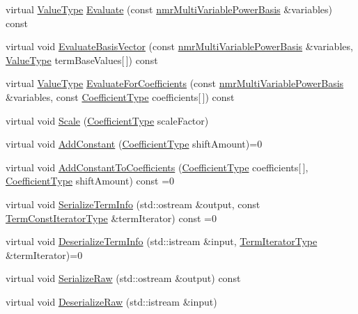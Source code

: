 \begin{DoxyCompactItemize}
\item 
virtual \hyperlink{classnmr_polynomial_base_a72f0bc16b225e4708bcf15a77ba206e3}{Value\+Type} \hyperlink{classnmr_polynomial_container_a8f747bfe057e3056dd1b544367569df3}{Evaluate} (const \hyperlink{classnmr_multi_variable_power_basis}{nmr\+Multi\+Variable\+Power\+Basis} \&variables) const 
\item 
virtual void \hyperlink{classnmr_polynomial_container_adf8130b5dc6b646596e2baf689de9a4b}{Evaluate\+Basis\+Vector} (const \hyperlink{classnmr_multi_variable_power_basis}{nmr\+Multi\+Variable\+Power\+Basis} \&variables, \hyperlink{classnmr_polynomial_base_a72f0bc16b225e4708bcf15a77ba206e3}{Value\+Type} term\+Base\+Values\mbox{[}$\,$\mbox{]}) const 
\item 
virtual \hyperlink{classnmr_polynomial_base_a72f0bc16b225e4708bcf15a77ba206e3}{Value\+Type} \hyperlink{classnmr_polynomial_container_a7cba138156c317147ea5bc49dc10e5be}{Evaluate\+For\+Coefficients} (const \hyperlink{classnmr_multi_variable_power_basis}{nmr\+Multi\+Variable\+Power\+Basis} \&variables, const \hyperlink{classnmr_polynomial_base_a8693efdfc8585ccb49abea69f74f3eef}{Coefficient\+Type} coefficients\mbox{[}$\,$\mbox{]}) const 
\item 
virtual void \hyperlink{classnmr_polynomial_container_aa6584fddf2054bc8ed4fb54a3be19aa3}{Scale} (\hyperlink{classnmr_polynomial_base_a8693efdfc8585ccb49abea69f74f3eef}{Coefficient\+Type} scale\+Factor)
\item 
virtual void \hyperlink{classnmr_polynomial_container_a883f221d9a4428feaa207f98470f721a}{Add\+Constant} (\hyperlink{classnmr_polynomial_base_a8693efdfc8585ccb49abea69f74f3eef}{Coefficient\+Type} shift\+Amount)=0
\item 
virtual void \hyperlink{classnmr_polynomial_container_a8495f9383c2168896c693bc954238845}{Add\+Constant\+To\+Coefficients} (\hyperlink{classnmr_polynomial_base_a8693efdfc8585ccb49abea69f74f3eef}{Coefficient\+Type} coefficients\mbox{[}$\,$\mbox{]}, \hyperlink{classnmr_polynomial_base_a8693efdfc8585ccb49abea69f74f3eef}{Coefficient\+Type} shift\+Amount) const =0
\item 
virtual void \hyperlink{classnmr_polynomial_container_aa8d77ebaccb2e9849b8921cf4a7408a8}{Serialize\+Term\+Info} (std\+::ostream \&output, const \hyperlink{classnmr_polynomial_container_aba8d31506ab6a487fdc4fe2815469442}{Term\+Const\+Iterator\+Type} \&term\+Iterator) const =0
\item 
virtual void \hyperlink{classnmr_polynomial_container_aa1d8ad137c0dce9e4d3b4f576ca4c0e8}{Deserialize\+Term\+Info} (std\+::istream \&input, \hyperlink{classnmr_polynomial_container_a276e57445d038e8a16462f47b85719a3}{Term\+Iterator\+Type} \&term\+Iterator)=0
\item 
virtual void \hyperlink{classnmr_polynomial_container_a1fb16b0f2382343c1313b5fb2c6d5e6e}{Serialize\+Raw} (std\+::ostream \&output) const 
\item 
virtual void \hyperlink{classnmr_polynomial_container_a2a166a5b7f970b2fec4a374fcfc1de44}{Deserialize\+Raw} (std\+::istream \&input)
\end{DoxyCompactItemize}
